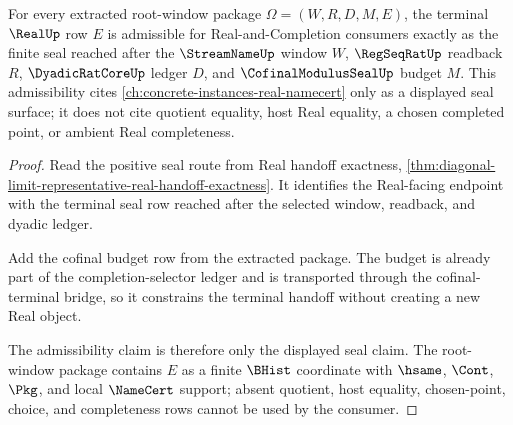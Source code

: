 \begin{theorem}
\label{thm:diagonal-limit-representative-real-seal-admissibility}
For every extracted root-window package $\Omega=(W,R,D,M,E)$, the terminal $\RealUp$ row $E$ is admissible for Real-and-Completion consumers exactly as the finite seal reached after the $\StreamNameUp$ window $W$, $\RegSeqRatUp$ readback $R$, $\DyadicRatCoreUp$ ledger $D$, and $\CofinalModulusSealUp$ budget $M$. This admissibility cites \autoref{ch:concrete-instances-real-namecert} only as a displayed seal surface; it does not cite quotient equality, host Real equality, a chosen completed point, or ambient Real completeness.
\end{theorem}
\begin{proof}
Read the positive seal route from Real handoff exactness, \autoref{thm:diagonal-limit-representative-real-handoff-exactness}. It identifies the Real-facing endpoint with the terminal seal row reached after the selected window, readback, and dyadic ledger.

Add the cofinal budget row from the extracted package. The budget is already part of the completion-selector ledger and is transported through the cofinal-terminal bridge, so it constrains the terminal handoff without creating a new Real object.

The admissibility claim is therefore only the displayed seal claim. The root-window package contains $E$ as a finite $\BHist$ coordinate with $\hsame$, $\Cont$, $\Pkg$, and local $\NameCert$ support; absent quotient, host equality, chosen-point, choice, and completeness rows cannot be used by the consumer.
\end{proof}

